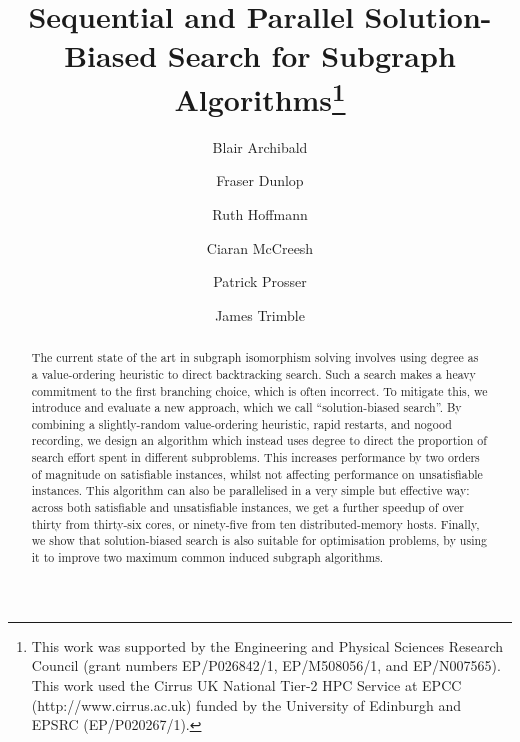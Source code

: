 \documentclass[runningheads]{llncs}
\begin{document}
\title{Sequential and Parallel Solution-Biased Search for Subgraph Algorithms\thanks{This work was
supported by the Engineering and Physical Sciences Research Council (grant numbers EP/P026842/1,
EP/M508056/1, and EP/N007565). This work used the Cirrus UK National Tier-2 HPC Service at EPCC
(http://www.cirrus.ac.uk) funded by the University of Edinburgh and EPSRC (EP/P020267/1).}}

\author{Blair Archibald\and
Fraser Dunlop\and
Ruth Hoffmann\and
Ciaran McCreesh\and
Patrick Prosser \and
James Trimble}



\maketitle

\begin{abstract}
    The current state of the art in subgraph isomorphism solving involves using degree as a
    value-ordering heuristic to direct backtracking search. Such a search makes a heavy commitment
    to the first branching choice, which is often incorrect. To mitigate this, we introduce and
    evaluate a new approach, which we call ``solution-biased search''. By combining a
    slightly-random value-ordering heuristic, rapid restarts, and nogood recording, we design an
    algorithm which instead uses degree to direct the proportion of search effort spent in different
    subproblems. This increases performance by two orders of magnitude on satisfiable instances,
    whilst not affecting performance on unsatisfiable instances. This algorithm can also be
    parallelised in a very simple but effective way: across both satisfiable and unsatisfiable
    instances, we get a further speedup of over thirty from thirty-six cores, or ninety-five from
    ten distributed-memory hosts. Finally, we show that solution-biased search is also suitable for
    optimisation problems, by using it to improve two maximum common induced subgraph algorithms.
\end{abstract}
\end{document}
